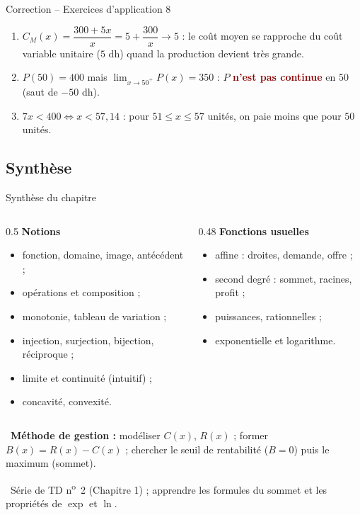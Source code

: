 \documentclass[aspectratio=169,11pt]{beamer}
\providecommand{\faPencilAlt}{\faIcon{pencil-alt}}
\newcommand{\important}[1]{\textcolor{DarkRed}{\textbf{#1}}}
\begin{document}
\begin{frame}{Correction -- Exercices d'application 8}
	\small
	\begin{enumerate}
		\item $C_M(x)=\dfrac{300+5x}{x}=5+\dfrac{300}{x}\to5$ : le coût moyen se rapproche du coût variable unitaire ($5$ dh) quand la production devient très grande.
		\item $P(50)=400$ mais $\lim_{x\to50^+}P(x)=350$ : $P$ \important{n'est pas continue} en $50$ (saut de $-50$ dh).
		\item $7x<400\iff x<57{,}14$ : pour $51\le x\le57$ unités, on paie moins que pour $50$ unités.
	\end{enumerate}
\end{frame}

\subsection{Synthèse}

\begin{frame}{Synthèse du chapitre}
	\begin{columns}[T]
		\begin{column}{0.5\textwidth}
			\textbf{Notions}
			\begin{itemize}\small
				\item fonction, domaine, image, antécédent ;
				\item opérations et composition ;
				\item monotonie, tableau de variation ;
				\item injection, surjection, bijection, réciproque ;
				\item limite et continuité (intuitif) ;
				\item concavité, convexité.
			\end{itemize}
		\end{column}
		\begin{column}{0.48\textwidth}
			\textbf{Fonctions usuelles}
			\begin{itemize}\small
				\item affine : droites, demande, offre ;
				\item second degré : sommet, racines, profit ;
				\item puissances, rationnelles ;
				\item exponentielle et logarithme.
			\end{itemize}
		\end{column}
	\end{columns}
	\vspace{0.2cm}
	\begin{applicationbox}
		\faBullseye\ \textbf{Méthode de gestion :} modéliser $C(x)$, $R(x)$ ; former $B(x)=R(x)-C(x)$ ; chercher le seuil de rentabilité ($B=0$) puis le maximum (sommet).
	\end{applicationbox}
	\vspace{0.1cm}
	\begin{attentionbox}[À faire]\small
		\faPencilAlt\ Série de TD n\textsuperscript{o}~2 (Chapitre 1) ; apprendre les formules du sommet et les propriétés de $\exp$ et $\ln$.
	\end{attentionbox}
\end{frame}
\end{document}
